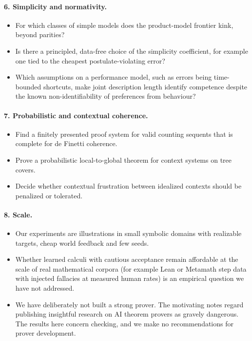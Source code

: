 \paragraph{6. Simplicity and normativity.}
\begin{itemize}
\item For which classes of simple models does the product-model frontier kink, beyond parities?
\item Is there a principled, data-free choice of the simplicity coefficient, for example one tied to the cheapest postulate-violating error?
\item Which assumptions on a performance model, such as errors being time-bounded shortcuts, make joint description length identify competence despite the known non-identifiability of preferences from behaviour?
\end{itemize}

\paragraph{7. Probabilistic and contextual coherence.}
\begin{itemize}
\item Find a finitely presented proof system for valid counting sequents that is complete for de Finetti coherence.
\item Prove a probabilistic local-to-global theorem for context systems on tree covers.
\item Decide whether contextual frustration between idealized contexts should be penalized or tolerated.
\end{itemize}

\paragraph{8. Scale.}
\begin{itemize}
\item Our experiments are illustrations in small symbolic domains with realizable targets, cheap world feedback and few seeds.
\item Whether learned calculi with cautious acceptance remain affordable at the scale of real mathematical corpora (for example Lean or Metamath step data with injected fallacies at measured human rates) is an empirical question we have not addressed.
\item We have deliberately not built a strong prover. The motivating notes regard publishing insightful research on AI theorem provers as gravely dangerous. The results here concern checking, and we make no recommendations for prover development.
\end{itemize}
